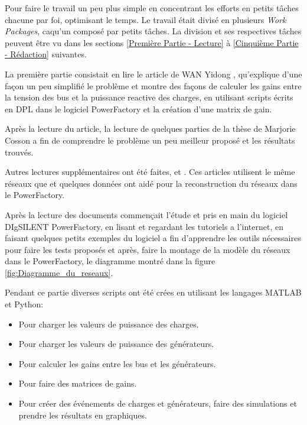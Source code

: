 Pour faire le travail un peu plus simple en concentrant les efforts en petits tâches chacune par foi, optimisant le temps. Le travail était divisé en plusieurs \textit{Work Packages}, caqu'un composé par petits tâches. La division et ses respectives tâches peuvent être vu dans les sections \ref{Première Partie  - Lecture} à \ref{Cinquième Partie - Rédaction} suivantes.

La première partie consistait en lire le article de WAN Yidong \cite{yidong}, qu'explique d'une façon un peu simplifié le problème et montre des façons de calculer les gains entre la tension des bus et la puissance reactive des charges, en utilisant scripts écrits en \gls{DPL} dans le logiciel PowerFactory et la création d'une matrix de gain.

Après la lecture du article, la lecture de quelques parties de la thèse de Marjorie Cosson \cite{cosson:tel-01374469} a fin de comprendre le problème un peu meilleur   proposé et les résultats trouvés. 

Autres lectures supplémentaires ont été faites, \cite{farina2015model} et \cite{mariani2013controllo}. Ces articles utilisent le même réseaux que \cite{cosson:tel-01374469} et quelques données ont aidé pour la reconstruction du réseaux dans le PowerFactory.


Après la lecture des documents commençait l'étude et pris en main du logiciel DIgSILENT PowerFactory, en lisant et regardant les tutoriels a l'internet, en faisant quelques petits exemples du logiciel a fin d'apprendre les outils nécessaires pour faire les tests proposés et après, faire la montage de la modèle du réseaux dans le PowerFactory, le diagramme montré dans la figure \ref{fig:Diagramme_du_reseaux}. 

Pendant ce partie diverses scripts ont été crées en utilisant les langages MATLAB et Python:
\begin{itemize}
	\item Pour charger les valeurs de puissance des charges.
	\item Pour charger les valeurs de puissance des générateurs.
	\item Pour calculer les gains entre les bus et les générateurs.
	\item Pour faire des matrices de gains.
	\item Pour créer des événements de charges et générateurs, faire des simulations et prendre les résultats en graphiques.
\end{itemize}

